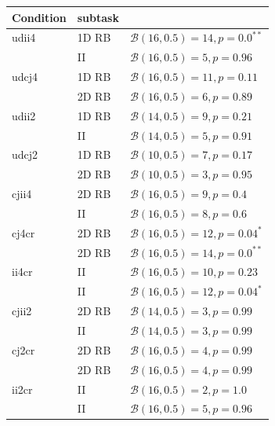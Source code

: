 \documentclass[doc, floatsintext]{apa7}
\begin{document}
\clearpage
\begin{center}
    \begin{minipage}{\textwidth}
        \begin{tabular}{lll}
            \toprule
            Condition & subtask &                                       \\
            \midrule
            udii4 &    1D RB &  $\mathcal{B}(16, 0.5) = 14, p = 0.0^{**}$ \\
            &       II &  $\mathcal{B}(16, 0.5) = 5, p = 0.96$ \\
            udcj4 &    1D RB & $\mathcal{B}(16, 0.5) = 11, p = 0.11$ \\
            &    2D RB &  $\mathcal{B}(16, 0.5) = 6, p = 0.89$ \\
            udii2 &    1D RB &  $\mathcal{B}(14, 0.5) = 9, p = 0.21$ \\
            &       II &  $\mathcal{B}(14, 0.5) = 5, p = 0.91$ \\
            udcj2 &    1D RB &  $\mathcal{B}(10, 0.5) = 7, p = 0.17$ \\
            &    2D RB &  $\mathcal{B}(10, 0.5) = 3, p = 0.95$ \\
            cjii4 &    2D RB &   $\mathcal{B}(16, 0.5) = 9, p = 0.4$ \\
            &       II &   $\mathcal{B}(16, 0.5) = 8, p = 0.6$ \\
            cj4cr &    2D RB & $\mathcal{B}(16, 0.5) = 12, p = 0.04^{*}$ \\
            &       2D RB &  $\mathcal{B}(16, 0.5) = 14, p = 0.0^{**}$ \\
            ii4cr &       II & $\mathcal{B}(16, 0.5) = 10, p = 0.23$ \\
            &       II & $\mathcal{B}(16, 0.5) = 12, p = 0.04^{*}$ \\
            cjii2 &    2D RB &  $\mathcal{B}(14, 0.5) = 3, p = 0.99$ \\
            &       II &  $\mathcal{B}(14, 0.5) = 3, p = 0.99$ \\
            cj2cr &    2D RB &  $\mathcal{B}(16, 0.5) = 4, p = 0.99$ \\
            &       2D RB &  $\mathcal{B}(16, 0.5) = 4, p = 0.99$ \\
            ii2cr &       II &   $\mathcal{B}(16, 0.5) = 2, p = 1.0$ \\
            &       II  &  $\mathcal{B}(16, 0.5) = 5, p = 0.96$ \\
            \bottomrule
        \end{tabular}
        \label{table_2}
    \end{minipage}
\end{center}
\end{document}
